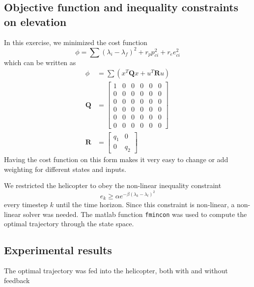 \subsection{Objective function and inequality constraints on elevation}
In this exercise, we minimized the cost function
\begin{equation}
        \phi =\sum (\lambda_i - \lambda_f)^2 + r_{p}p_{ci}^2 + r_{e}e_{ci}^2
\end{equation}
which can be written as
\begin{subequations}
    \begin{align}
        \phi &= \sum(x^{T}\mathbf{Q}x+u^{T}\mathbf{R}u) \\
        \mathbf{Q} &= \begin{bmatrix}
        1 & 0 & 0 & 0 & 0 & 0         \\
        0 & 0 & 0 & 0 & 0 & 0         \\
        0 & 0 & 0 & 0 & 0 & 0         \\
        0 & 0 & 0 & 0 & 0 & 0         \\
        0 & 0 & 0 & 0 & 0 & 0         \\
        0 & 0 & 0 & 0 & 0 & 0         
        \end{bmatrix}\\
        \mathbf{R} &= \begin{bmatrix}
            q_1        & 0        \\
            0          & q_2        
        \end{bmatrix}
    \end{align}
\end{subequations}
Having the cost function on this form makes it very easy to change or add weighting for different states and inputs.

We restricted the helicopter to obey the non-linear inequality constraint
\begin{equation}
e_k \geq \alpha e^{-\beta(\lambda_k-\lambda_t)^{2}}
\end{equation}
every timestep $k$ until the time horizon.
Since this constraint is non-linear, a non-linear solver was needed. The matlab function \texttt{fmincon} was used to compute the optimal trajectory through the state space.



\subsection{Experimental results}
The optimal trajectory was fed into the helicopter, both with and without feedback



